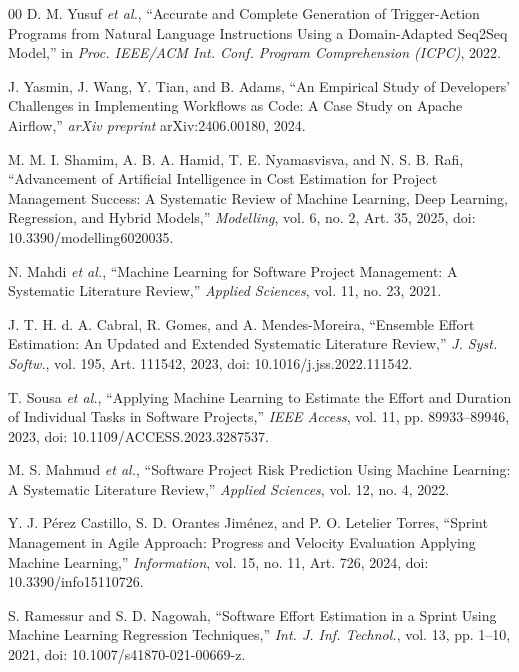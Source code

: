 \documentclass[conference]{IEEEtran}
\begin{document}
\begin{thebibliography}{00}
D. M. Yusuf \textit{et al.}, ``Accurate and Complete Generation of Trigger-Action Programs from Natural Language Instructions Using a Domain-Adapted Seq2Seq Model,''
in \textit{Proc. IEEE/ACM Int. Conf. Program Comprehension (ICPC)}, 2022.

J. Yasmin, J. Wang, Y. Tian, and B. Adams, ``An Empirical Study of Developers' Challenges in Implementing Workflows as Code: A Case Study on Apache Airflow,''
\textit{arXiv preprint} arXiv:2406.00180, 2024.

M. M. I. Shamim, A. B. A. Hamid, T. E. Nyamasvisva, and N. S. B. Rafi,
``Advancement of Artificial Intelligence in Cost Estimation for Project Management Success: A Systematic Review of Machine Learning, Deep Learning, Regression, and Hybrid Models,''
\textit{Modelling}, vol. 6, no. 2, Art. 35, 2025,
doi: 10.3390/modelling6020035.

N. Mahdi \textit{et al.}, ``Machine Learning for Software Project Management: A Systematic Literature Review,''
\textit{Applied Sciences}, vol. 11, no. 23, 2021.

J. T. H. d. A. Cabral, R. Gomes, and A. Mendes-Moreira,
``Ensemble Effort Estimation: An Updated and Extended Systematic Literature Review,''
\textit{J. Syst. Softw.}, vol. 195, Art. 111542, 2023,
doi: 10.1016/j.jss.2022.111542.

T. Sousa \textit{et al.}, ``Applying Machine Learning to Estimate the Effort and Duration of Individual Tasks in Software Projects,''
\textit{IEEE Access}, vol. 11, pp. 89933--89946, 2023,
doi: 10.1109/ACCESS.2023.3287537.

M. S. Mahmud \textit{et al.}, ``Software Project Risk Prediction Using Machine Learning: A Systematic Literature Review,''
\textit{Applied Sciences}, vol. 12, no. 4, 2022.

Y. J. P\'erez Castillo, S. D. Orantes Jim\'enez, and P. O. Letelier Torres,
``Sprint Management in Agile Approach: Progress and Velocity Evaluation Applying Machine Learning,''
\textit{Information}, vol. 15, no. 11, Art. 726, 2024,
doi: 10.3390/info15110726.

S. Ramessur and S. D. Nagowah,
``Software Effort Estimation in a Sprint Using Machine Learning Regression Techniques,''
\textit{Int. J. Inf. Technol.}, vol. 13, pp. 1--10, 2021,
doi: 10.1007/s41870-021-00669-z.


\end{thebibliography}
\end{document}

